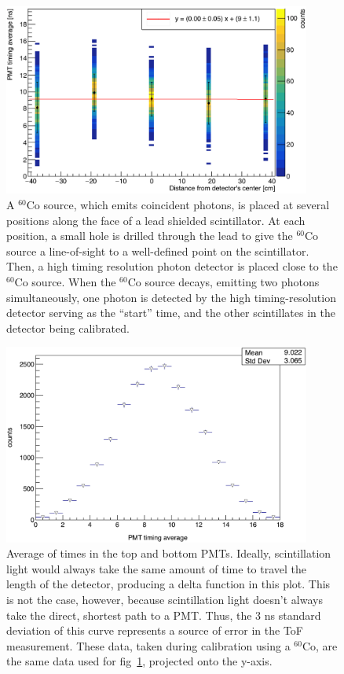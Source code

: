 \begin{figure}[H]
    \centering
    \includegraphics[width = 0.9\textwidth]{Content/Methods/CO60Validation.png}
    \caption{A $^{60}$Co source, which emits coincident photons, is placed at several positions along the face of a lead shielded scintillator.
    At each position, a small hole is drilled through the lead to give the $^{60}$Co source a line-of-sight to a well-defined point on the scintillator.
    Then, a high timing resolution photon detector is placed close to the $^{60}$Co source.
    When the $^{60}$Co source decays, emitting two photons simultaneously, one photon is detected by the high timing-resolution detector serving as the ``start'' time, and the other scintillates in the detector being calibrated.}
    \label{fig:Co60Validation}
\end{figure}
\begin{figure}
    \centering
    \includegraphics[width = 0.9\textwidth]{Content/Methods/CO60ValidationProject.png}
    \caption{Average of times in the top and bottom PMTs.
    Ideally, scintillation light would always take the same amount of time to travel the length of the detector, producing a delta function in this plot.
    This is not the case, however, because scintillation light doesn't always take the direct, shortest path to a PMT.
    Thus, the 3 ns standard deviation of this curve represents a source of error in the ToF measurement.
    These data, taken during calibration using a $^{60}$Co, are the same data used for fig~\ref{fig:Co60Validation}, projected onto the y-axis.
}
    \label{fig:Co60ValidationProject}
\end{figure}

